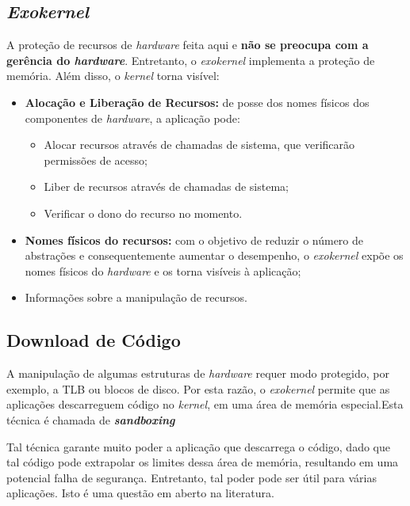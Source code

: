 
\subsection{\textit{Exokernel}}
A proteção de recursos de \textit{hardware} feita aqui e \textbf{não se preocupa com a gerência do \textit{hardware}}. Entretanto, o \textit{exokernel} implementa a proteção de memória. Além disso, o \textit{kernel} torna visível:
\begin{itemize}

  \item \textbf{Alocação e Liberação de Recursos:} de posse dos nomes físicos dos componentes de \textit{hardware}, a aplicação pode:
  \begin{itemize}
    \item Alocar recursos através de chamadas de sistema, que verificarão permissões de acesso;

    \item Liber de recursos através de chamadas de sistema;

    \item Verificar o dono do recurso no momento.
  \end{itemize}

  \item \textbf{Nomes físicos do recursos:} com o objetivo de reduzir o número de abstrações e consequentemente aumentar o desempenho, o \textit{exokernel} expõe os nomes físicos do \textit{hardware} e os torna visíveis à aplicação;

  \item Informações sobre a manipulação de recursos.
\end{itemize}


\subsection{Download de Código}
A manipulação de algumas estruturas de \textit{hardware} requer modo protegido, por exemplo, a TLB ou blocos de disco. Por esta razão, o \textit{exokernel} permite que as aplicações descarreguem código no \textit{kernel}, em uma área de memória especial.Esta técnica é chamada de \textbf{\textit{sandboxing}}

Tal técnica garante muito poder a aplicação que descarrega o código, dado que tal código pode extrapolar os limites dessa área de memória, resultando em uma potencial falha de segurança. Entretanto, tal poder pode ser útil para várias aplicações. Isto é uma questão em aberto na literatura.


